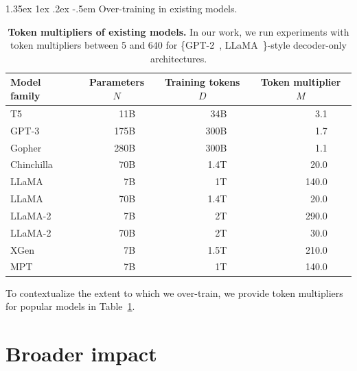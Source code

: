 \documentclass[dvipsnames,11pt]{article}
\makeatletter
\renewcommand\paragraph{\@startsection{paragraph}{4}{\z@}                                     {1.35ex \@plus1ex \@minus.2ex}                                {-.5em}
{\normalfont\normalsize\bfseries}}
\makeatother
\begin{document}
\begin{appendix}
\paragraph{Over-training in existing models.}
\begin{table}[t!]
    \centering
    \small
    \caption{\textbf{Token multipliers of existing models.} In our work, we run experiments with token multipliers between 5 and 640 for \{GPT-2~\cite{Radford2019LanguageMA}, LLaMA~\cite{llama}\}-style decoder-only architectures.}
    \begin{tabular}{lp{1em}rlp{1.5em}rlp{2em}rl}
        \toprule
         Model family & \multicolumn{3}{c}{Parameters $N$} & \multicolumn{3}{c}{Training tokens $D$} & \multicolumn{3}{c}{Token multiplier $M$} \\
         \midrule
         T5~\cite{raffel2020exploring} & & 11B  & & & 34B  & & & 3.1\\
         GPT-3~\cite{gpt3}             & & 175B & & & 300B & & & 1.7\\
         Gopher~\cite{gopher}          & & 280B & & & 300B & & & 1.1\\
         Chinchilla~\cite{chinchilla}  & & 70B  & & & 1.4T & & & 20{.0}\\
         LLaMA~\cite{llama}            & & 7B   & & & 1T   & & & 140{.0}\\
         LLaMA~\cite{llama}            & & 70B  & & & 1.4T & & & 20{.0} \\
         LLaMA-2~\cite{llama2}         & & 7B   & & & 2T   & & & 290{.0} \\
         LLaMA-2~\cite{llama2}         & & 70B  & & & 2T   & & & 30{.0} \\
         XGen~\cite{XGen}              & & 7B   & & & 1.5T & & & 210{.0}\\
         MPT~\cite{MosaicML2023Introducing} & & 7B & & & 1T & & & 140{.0} \\\bottomrule
    \end{tabular}
    \label{tab:other_mults}
\end{table}
To contextualize the extent to which we over-train, we provide token multipliers for popular models in Table~\ref{tab:other_mults}.

\section{Broader impact}
\label{appx:broader}


\end{appendix}
\end{document}
